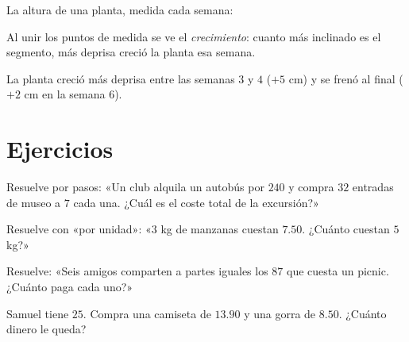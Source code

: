 \begin{example}\label{ex:g5:data:line}
La altura de una planta, medida cada semana:

\begin{omfigure}

{\small Al unir los puntos de medida se ve el \emph{crecimiento}: cuanto más
inclinado es el segmento, más deprisa creció la planta esa semana.}
\end{omfigure}

La planta creció más deprisa entre las semanas $3$ y $4$ ($+5$ cm) y
se frenó al final ($+2$ cm en la semana $6$).
\end{example}

\section{Ejercicios}

\begin{exercise}[$\star$]\label{exo:g5:data:1}
Resuelve por pasos: «Un club alquila un autobús por $240$ y compra $32$ entradas
de museo a $7$ cada una. ¿Cuál es el coste total de la excursión?»
\end{exercise}

\begin{exercise}[$\star$]\label{exo:g5:data:2}
Resuelve con «por unidad»: «$3$ kg de manzanas cuestan $7.50$. ¿Cuánto cuestan
$5$ kg?»
\end{exercise}

\begin{exercise}[$\star$]\label{exo:g5:data:3}
Resuelve: «Seis amigos comparten a partes iguales los $87$ que cuesta un picnic. ¿Cuánto
paga cada uno?»
\end{exercise}

\begin{exercise}[$\star$]\label{exo:g5:data:4}
Samuel tiene $25$. Compra una camiseta de $13.90$ y una gorra de $8.50$. ¿Cuánto
dinero le queda?
\end{exercise}

